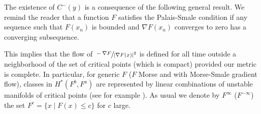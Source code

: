 \documentclass[JEP,XML,SOM,NoFloatCountersInSection,Unicode,published]{cedram}
\numberwithin{equation}{section}
\theoremstyle{plain}
\theoremstyle{definition}
\theoremstyle{remark}
\begin{document}
The existence of $C^{-}(y)$ is a consequence of the following general result. We remind the reader that a function $F$ satisfies the Palais-Smale condition if any sequence such that $F(x_{n})$ is bounded and $\nabla F(x_{n})$ converges to zero has a converging subsequence.

This implies that the flow of $\sfrac{-\nabla F}{ \vert \nabla F (x) \vert^{2} }$
is defined for all time outside a neighborhood of the set of critical points (which is compact) provided our metric is complete. In particular, for generic $F$ (\ie $F$ Morse and with Morse-Smale gradient flow), classes in $H^{*}(F^{b}, F^{a})$ are represented by linear combinations of unstable manifolds of critical points (see for example \cite{Laudenbach-Bismut}). As usual we denote by $F^{\infty}$ (\resp $F^{-\infty}$) the set $F^{c}=\{ x \mid F(x) \leq c \}$ for $c$ large.
\end{document}
